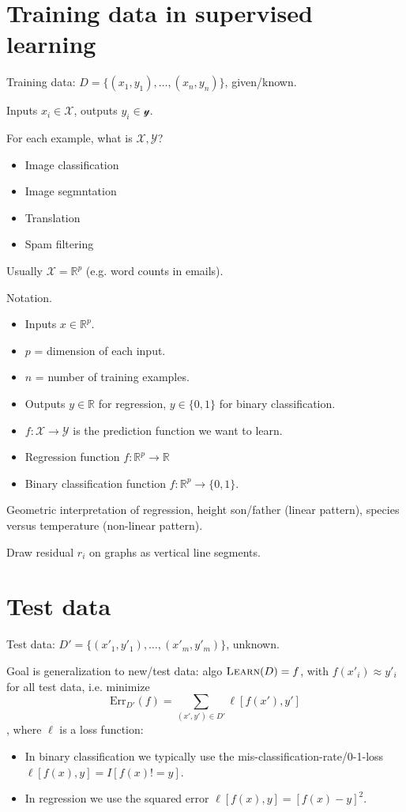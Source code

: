 \documentclass{article}
\begin{document}
\section{Training data in supervised learning}

Training data: $D= \{(x_1,y_1), \dots, (x_n,y_n)\}$, given/known.

Inputs $x_i\in\mathcal X$, outputs
$y_i\in\mathcal y$.

For each example, what is $\mathcal X,\mathcal Y$? 
\begin{itemize}
\item Image classification
\item Image segmntation
\item Translation
\item Spam filtering
\end{itemize}

Usually $\mathcal X = \mathbb R^p$ (e.g. word counts in emails).

Notation. 
\begin{itemize}
\item Inputs $x\in\mathbb R^p$.
\item $p$ = dimension of each input.
\item $n$ = number of training examples.
\item Outputs $y\in\mathbb R$ for regression, $y\in\{0,1\}$ for binary
  classification.
\item $f:\mathcal X\rightarrow \mathcal Y$ is the prediction function
  we want to learn.
\item Regression function $f:\mathbb R^p\rightarrow\mathbb R$
\item Binary classification function $f:\mathbb R^p\rightarrow \{0,1\}$.
\end{itemize}

Geometric interpretation of regression, height son/father (linear
pattern), species versus temperature (non-linear pattern).

Draw residual $r_i$ on graphs as vertical line segments.

\section{Test data}

Test data: $D'= \{ (x'_1,y'_1), \dots, (x'_m,y'_m)\}$, unknown.

Goal is generalization to new/test data: algo $\textsc{Learn}(D) = f$,
with $f(x'_i)\approx y'_i$ for all test data, i.e. minimize
$$ \text{Err}_{D'}(f) = \sum_{(x',y')\in D'} \ell[f(x'), y'] $$,
where $\ell$ is a loss function:
\begin{itemize}
\item In binary classification we typically use the
  mis-classification-rate/0-1-loss $\ell[f(x),y]=I[f(x)!=y]$.
\item In regression we use the squared error $\ell[f(x),y]=[f(x)-y]^2$.
\end{itemize}
\end{document}
